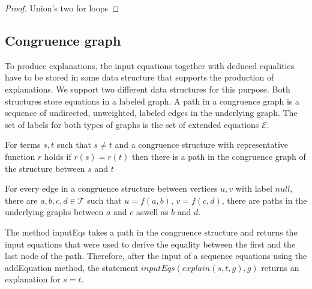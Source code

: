 \begin{proof}

Union's two for loops

\end{proof}

\FloatBarrier

\subsection*{Congruence graph}

To produce explanations, the input equations together with deduced equalities have to be stored in some data structure that supports the production of explanations.
We support two different data structures for this purpose.
Both structures store equations in a labeled graph.
A path in a congruence graph is a sequence of undirected, unweighted, labeled edges in the underlying graph.
The set of labels for both types of graphs is the set of extended equations $\mathcal{E}$.

\begin{invariant}[Paths]

For terms $s, t$ such that $s \neq t$ and a congruence structure with representative function $r$ holds if $r(s) = r(t)$ then there is a path in the congruence graph of the structure between $s$ and $t$

\end{invariant}

\begin{invariant}[Insert]

For every edge in a congruence structure between vertices $u,v$ with label $null$, 
there are $a,b,c,d \in \mathcal{T}$ such that $u = f(a,b)$, $v = f(c,d)$, 
there are paths in the underlying graphs between $a$ and $c$ aswell as $b$ and $d$.

\end{invariant}


The method inputEqs takes a path in the congruence structure and returns the input equations that were used to derive the equality between the first and the last node of the path.
Therefore, after the input of a sequence equations using the addEquation method, the statement $inputEqs(explain(s,t,g),g)$ returns an explanation for $s = t$.




